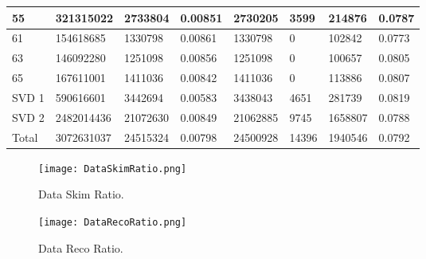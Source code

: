 \documentclass[11pt]{article}
\begin{document}
\begin{tabular}{ | l || l | l | l || l | l | l | l |}
  55&321315022&2733804&0.00851&2730205&3599&214876&0.0787\\\hline
  61&154618685&1330798&0.00861&1330798&0&102842&0.0773\\\hline
  63&146092280&1251098&0.00856&1251098&0&100657&0.0805\\\hline
  65&167611001&1411036&0.00842&1411036&0&113886&0.0807\\\hline
  \hline
  SVD 1&590616601&3442694&0.00583&3438043&4651&281739&0.0819\\\hline
  SVD 2&2482014436&21072630&0.00849&21062885&9745&1658807&0.0788\\ \hline
  Total&3072631037&24515324&0.00798&24500928&14396&1940546&0.0792\\ \hline
\end{tabular}


\begin{figure}[!tbh]
  \centering
  \begin{minipage}[b]{0.4\textwidth}
    \texttt{[image: DataSkimRatio.png]}
    \caption{Data Skim Ratio.}
  \end{minipage}
  \hfill
  \begin{minipage}[b]{0.4\textwidth}
    \texttt{[image: DataRecoRatio.png]}
    \caption{Data Reco Ratio.}
    \end{minipage}
\end{figure}
\end{document}
